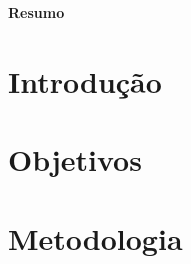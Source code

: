 \documentclass[12pt,a4paper]{article}
\begin{document}
\pagestyle{empty}
\begin{center}
    {\bf \Large Resumo}
\end{center}



\noindent{}
\newpage
\pagestyle{empty}
\tableofcontents
\newpage
\setcounter{page}{1}
\pagestyle{plain}

\section{Introdução}
\label{section:introducao}


\section{Objetivos}
\label{section:objetivos}


\section{Metodologia}
\label{section:metodologia}




\newpage



\end{document}
